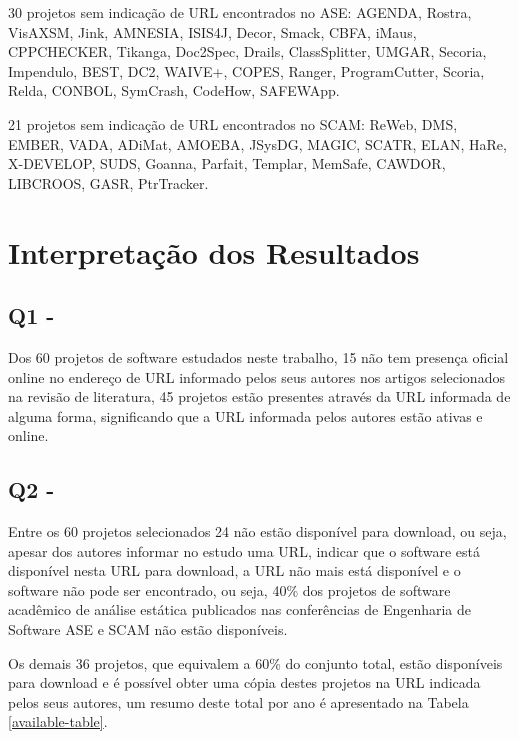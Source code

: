 30 projetos sem indicação de URL encontrados no ASE:
AGENDA, Rostra, VisAXSM, Jink, AMNESIA, ISIS4J, Decor, Smack, CBFA, iMaus,
CPPCHECKER, Tikanga, Doc2Spec, Drails, ClassSplitter, UMGAR, Secoria,
Impendulo, BEST, DC2, WAIVE+, COPES, Ranger, ProgramCutter, Scoria, Relda,
CONBOL, SymCrash, CodeHow, SAFEWApp.

21 projetos sem indicação de URL encontrados no SCAM:
ReWeb, DMS, EMBER, VADA, ADiMat, AMOEBA, JSysDG, MAGIC, SCATR, ELAN, HaRe,
X-DEVELOP, SUDS, Goanna, Parfait, Templar, MemSafe, CAWDOR, LIBCROOS, GASR,
PtrTracker.

\section{Interpretação dos Resultados} \label{estudo1:interpretacao}

\subsection{Q1 - \EstudoUmQuestaoUm} %

Dos 60 projetos de software estudados neste trabalho, 15 não tem presença
oficial online no endereço de URL informado pelos seus autores nos artigos
selecionados na revisão de literatura, 45 projetos estão presentes através da
URL informada de alguma forma, significando que a URL informada pelos autores
estão ativas e online. %

\subsection{Q2 - \EstudoUmQuestaoDois} %

Entre os 60 projetos selecionados 24 não estão disponível para download, ou
seja, apesar dos autores informar no estudo uma URL, indicar que o software
está disponível nesta URL para download, a URL não mais está disponível e o
software não pode ser encontrado, ou seja, 40\% dos projetos de software
acadêmico de análise estática publicados nas conferências de Engenharia de
Software ASE e SCAM não estão disponíveis.

Os demais 36 projetos, que equivalem a 60\% do conjunto total, estão
disponíveis para download e é possível obter uma cópia destes projetos na URL
indicada pelos seus autores, um resumo deste total por ano é apresentado na
Tabela \ref{available-table}.



